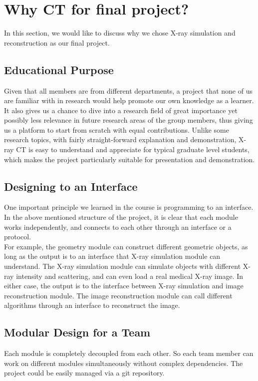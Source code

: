 \documentclass[11]{article}
\begin{document}
\section{Why CT for final project?}
	In this section, we would like to discuss why we chose X-ray simulation and reconstruction as our final project.
	\subsection{Educational Purpose}
		Given that all members are from different departments, a project that none of us are familiar with in research would help promote our own knowledge as a learner. It also gives us a chance to dive into a research field of great importance yet possibly less relevance in future research areas of the group members, thus giving us a platform to start from scratch with equal contributions. Unlike some research topics, with fairly straight-forward explanation and demonstration, X-ray CT is easy to understand and appreciate for typical graduate level students, which makes the project particularly suitable for presentation and demonstration.
	
\subsection{Designing to an Interface}
	One important principle we learned in the course is programming to an interface. In the above mentioned structure of the project, it is clear that each module works independently, and connects to each other through an interface or a protocol.\\ For example, the geometry module can construct different geometric objects, as long as the output is to an interface that X-ray simulation module can understand. 	The X-ray simulation module can simulate objects with different X-ray intensity and scattering, and can even load a real medical X-ray image. In either case, the output is to the interface between X-ray simulation and image reconstruction module. The image reconstruction module can call different algorithms through an interface to reconstruct the image.

\subsection{Modular Design for a Team}
	Each module is completely decoupled from each other. So each team member can work on different modules simultaneously without complex dependencies. The project could be easily managed via a git repository. 
\end{document}
